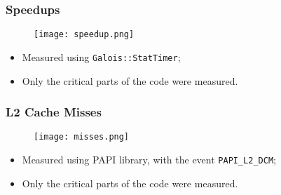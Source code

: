 \begin{frame}
	\frametitle{Speedups}
	\begin{figure}
		\texttt{[image: speedup.png]}
	\end{figure}

	\begin{itemize}
		\item Measured using \texttt{Galois::StatTimer};
		\item Only the critical parts of the code were measured.
	\end{itemize}
\end{frame}

\begin{frame}
	\frametitle{L2 Cache Misses}
	\begin{figure}
		\texttt{[image: misses.png]}
	\end{figure}

	\begin{itemize}
		\item Measured using PAPI library, with the event \texttt{PAPI\_L2\_DCM};
		\item Only the critical parts of the code were measured.
	\end{itemize}
	
\end{frame}